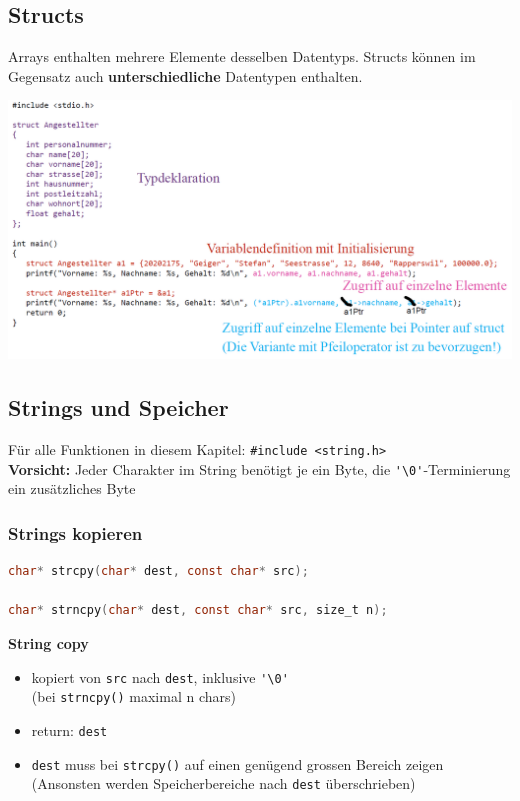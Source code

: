 	\subsection{Structs}
		Arrays enthalten mehrere Elemente desselben Datentyps. Structs können im Gegensatz auch \textbf{unterschiedliche} Datentypen enthalten. \\
		\begin{minipage}{1\linewidth}
			\includegraphics[width=0.9\linewidth]{Bilder/structs-bsp.png}
		\end{minipage}	

	\subsection{Strings und Speicher}
		Für alle Funktionen in diesem Kapitel: \verb|#include <string.h>|\\
		\textbf{Vorsicht:} Jeder Charakter im String benötigt je ein Byte, die \verb|'\0'|-Terminierung ein zusätzliches Byte
		\subsubsection{Strings kopieren}
			\begin{lstlisting}[language=C]
char* strcpy(char* dest, const char* src);

char* strncpy(char* dest, const char* src, size_t n);
			\end{lstlisting}
			\textbf{String copy}
				\begin{itemize}
					\item kopiert von \verb|src| nach \verb|dest|, inklusive \verb|'\0'| \\ (bei \verb|strncpy()| maximal n chars)
					\item return: \verb|dest|
					\item \verb|dest| muss bei \verb|strcpy()| auf einen genügend grossen Bereich zeigen\\ (Ansonsten werden Speicherbereiche nach \verb|dest| überschrieben)
				\end{itemize}

